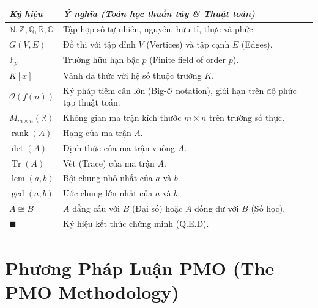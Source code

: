 \documentclass{article}
\begin{document}
\begin{table}[H]
    \centering
    \renewcommand{\arraystretch}{1.5}
    \begin{tabular}{p{3cm} p{12cm}}
        \hline
        \emph{Ký hiệu} & \emph{Ý nghĩa (Toán học thuần túy \& Thuật toán)} \\
        \hline
        $\mathbb{N}, \mathbb{Z}, \mathbb{Q}, \mathbb{R}, \mathbb{C}$ & Tập hợp số tự nhiên, nguyên, hữu tỉ, thực và phức. \\
        $G(V, E)$ & Đồ thị với tập đỉnh $V$ (Vertices) và tập cạnh $E$ (Edges). \\
        $\mathbb{F}_p$ & Trường hữu hạn bậc $p$ (Finite field of order $p$). \\
        $K[x]$ & Vành đa thức với hệ số thuộc trường $K$. \\
        $\mathcal{O}(f(n))$ & Ký pháp tiệm cận lớn (Big-$\mathcal{O}$ notation), giới hạn trên độ phức tạp thuật toán. \\
        $M_{m \times n}(\mathbb{R})$ & Không gian ma trận kích thước $m \times n$ trên trường số thực. \\
        $\operatorname{rank}(A)$ & Hạng của ma trận $A$. \\
        $\det(A)$ & Định thức của ma trận vuông $A$. \\
        $\operatorname{Tr}(A)$ & Vết (Trace) của ma trận $A$. \\
        $\operatorname{lcm}(a,b)$ & Bội chung nhỏ nhất của $a$ và $b$. \\
        $\gcd(a,b)$ & Ước chung lớn nhất của $a$ và $b$. \\
        $A \cong B$ & $A$ đẳng cấu với $B$ (Đại số) hoặc $A$ đồng dư với $B$ (Số học). \\
        $\blacksquare$ & Ký hiệu kết thúc chứng minh (Q.E.D). \\
        \hline
    \end{tabular}
\end{table}







\section{Phương Pháp Luận PMO (The PMO Methodology)}
\end{document}
